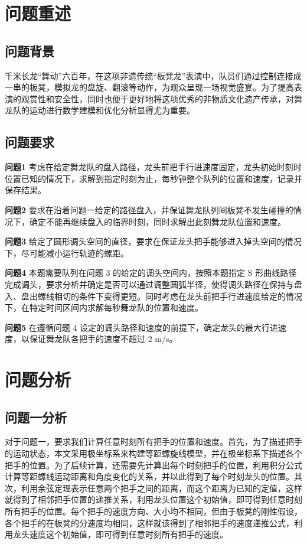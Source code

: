 \documentclass[withoutpreface,bwprint]{cumcmthesis}
\begin{document}

\section{问题重述}
\subsection{问题背景}
千米长龙“舞动”六百年，在这项非遗传统“板凳龙”表演中，队员们通过控制连接成一串的板凳，模拟龙的盘旋、翻滚等动作，为观众呈现一场视觉盛宴。为了提高表演的观赏性和安全性，同时也便于更好地将这项优秀的非物质文化遗产传承，对舞龙队的运动进行数学建模和优化分析显得尤为重要。




\subsection{问题要求}

\textbf{问题1}  考虑在给定舞龙队的盘入路径，龙头前把手行进速度固定，龙头初始时刻时位置已知的情况下，求解到指定时刻为止，每秒钟整个队列的位置和速度，记录并保存结果。

\textbf{问题2}  要求在沿着问题一给定的路径盘入，并保证舞龙队列间板凳不发生碰撞的情况下，确定不能再继续盘入的临界时刻，同时求解出此刻舞龙队位置和速度。

\textbf{问题3} 给定了圆形调头空间的直径，要求在保证龙头把手能够进入掉头空间的情况下，尽可能减小运行轨迹的螺距。

\textbf{问题4}  本题需要队列在问题 3 的给定的调头空间内，按照本题指定 S 形曲线路径完成调头，要求分析并确定是否可以通过调整圆弧半径，使得调头路径在保持与盘入、盘出螺线相切的条件下变得更短。同时考虑在龙头前把手行进速度给定的情况下，在特定时间区间内求解每秒舞龙队的位置和速度。

\textbf{问题5}  在遵循问题 4 设定的调头路径和速度的前提下，确定龙头的最大行进速度，以保证舞龙队各把手的速度不超过 2 m/s。

\section{问题分析}
\subsection{问题一分析}
对于问题一，要求我们计算任意时刻所有把手的位置和速度。首先，为了描述把手的运动状态，本文采用极坐标系来构建等距螺旋线模型，并在极坐标系下描述各个把手的位置。为了后续计算，还需要先计算出每个时刻把手的位置，利用积分公式计算等距螺线运动距离和角度变化的关系，并以此得到了每个时刻龙头的位置。其次，利用余弦定理表示任意两个把手之间的距离，而这个距离为已知的定值，这样就得到了相邻把手位置的递推关系，利用龙头位置这个初始值，即可得到任意时刻所有把手的位置。每个把手的速度方向、大小均不相同，但由于板凳的刚性假设，各个把手的在板凳的分速度均相同，这样就该得到了相邻把手的速度递推公式，利用龙头速度这个初始值，即可得到任意时刻所有把手的速度。
\end{document}
